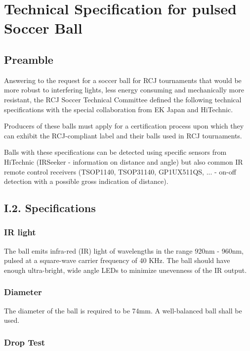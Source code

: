 \documentclass{article}
\begin{document}
\appendix
\section{Technical Specification for pulsed Soccer Ball\label{ref-pulsed-spec}}

\subsection{Preamble}

Answering to the request for a soccer ball for RCJ tournaments that would be
more robust to interfering lights, less energy consuming and mechanically more
resistant, the RCJ Soccer Technical Committee defined the following technical
specifications with the special collaboration from EK Japan and HiTechnic.

Producers of these balls must apply for a certification process upon which they
can exhibit the RCJ-compliant label and their balls used in RCJ tournaments.

Balls with these specifications can be detected using specific sensors from
HiTechnic (IRSeeker - information on distance and angle) but also common IR
remote control receivers (TSOP1140, TSOP31140, GP1UX511QS, ... - on-off
detection with a possible gross indication of distance).

\subsection{I.2. Specifications}

\subsubsection{IR light}

The ball emits infra-red (IR) light of wavelengths in the range 920nm - 960nm,
pulsed at a square-wave carrier frequency of 40 KHz. The ball should have
enough ultra-bright, wide angle LEDs to minimize unevenness of the IR output.

\subsubsection{Diameter}

The diameter of the ball is required to be 74mm. A well-balanced ball shall be
used.

\subsubsection{Drop Test}
\end{document}
